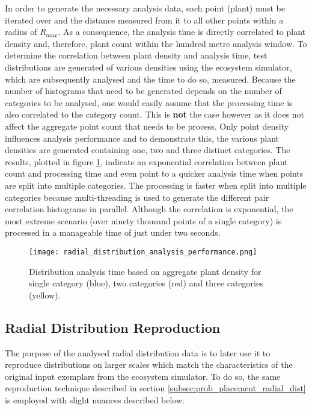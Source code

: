 In order to generate the necessary analysis data, each point (plant) must be iterated over and the distance measured from it to all other points within a radius of \textit{R$_{max}$}. As a consequence, the analysis time is directly correlated to plant density and, therefore, plant count within the hundred metre analysis window. To determine the correlation between plant density and analysis time, test distributions are generated of various densities using the ecosystem simulator, which are subsequently analysed and the time to do so, measured. Because the number of histograms that need to be generated depends on the number of categories to be analysed, one would easily assume that the processing time is also correlated to the category count. This is \textbf{not} the case however as it does not affect the aggregate point count that needs to be process. Only point density influences analysis performance and to demonstrate this, the various plant densities are generated containing one, two and three distinct categories. The results, plotted in figure \ref{fig:analysis_perf}, indicate an exponential correlation between plant count and processing time and even point to a quicker analysis time when points are split into multiple categories. The processing is faster when split into multiple categories because multi-threading is used to generate the different pair correlation histograms in parallel. Although the correlation is exponential, the most extreme scenario (over ninety thousand points of a single category) is processed in a manageable time of just under two seconds. \\

\begin{figure}
\center
	\texttt{[image: radial\_distribution\_analysis\_performance.png]}
	\caption{ Distribution analysis time based on aggregate plant density for single category (blue), two categories (red) and three categories (yellow).}	
	\label{fig:analysis_perf}
\end{figure}

\subsection{Radial Distribution Reproduction}

The purpose of the analysed radial distribution data is to later use it to reproduce distributions on larger scales which match the characteristics of the original input exemplars from the ecosystem simulator. To do so, the same reproduction technique described in section \ref{subsec:prob_placement_radial_dist} is employed with slight nuances described below.

